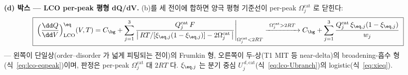 \textbf{(d) 박스 --- LCO per-peak 평형 dQ/dV.} (b)를 세 전이에 합하면 양극 평형 기준선이 per-peak
$\Omega_j^\mathrm{cat}$ 로 닫힌다:
\begin{equation}
\boxed{\;
\Big(\frac{\dd Q}{\dd V}\Big)^{\eq}_\mathrm{LCO}(V,T)
=C_\bg+\sum_{j=1}^{3}\frac{Q_j^\mathrm{cat}\,F}{\big|\,RT/[\xi_{\eq,j}(1-\xi_{\eq,j})]-2\Omega_j^\mathrm{cat}\,\big|}
\Bigg|_{\Omega_j^\mathrm{cat}<2RT}
\xrightarrow{\ \Omega_j^\mathrm{cat}>2RT\ }
C_\bg+\sum_{j=1}^{3}\frac{Q_j^\mathrm{cat}\,\xi_{\eq,j}(1-\xi_{\eq,j})}{w_j}\;}
\label{eq:lcoom-kernel}
\end{equation}
--- 왼쪽이 단일상(order--disorder 가 넓게 피팅되는 전이)의 Frumkin 형, 오른쪽이 두-상(T1 MIT 등 near-delta)의
broadening-흡수 형(식~\eqref{eq:lco-eqpeak})이며, 판정은 per-peak $\Omega_j^\mathrm{cat}$ 대 $2RT$ 다.
$\xi_{\eq,j}$ 는 분기 중심 $U_j^{\,d,\mathrm{cat}}$(식~\eqref{eq:lco-Ubranch})의 logistic(식~\eqref{eq:xieq}).

